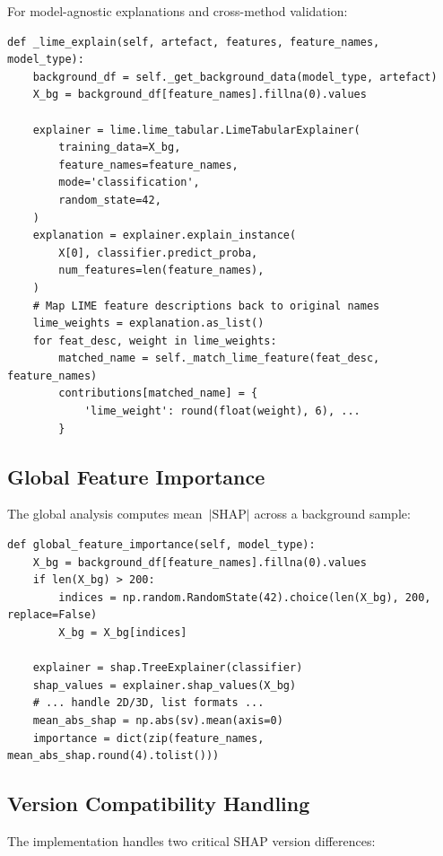 \documentclass[12pt,a4paper]{report}
\begin{document}
For model-agnostic explanations and cross-method validation:

\begin{lstlisting}[caption={LIME instance explanation (simplified)},label={lst:lime_explain}]
def _lime_explain(self, artefact, features, feature_names, model_type):
    background_df = self._get_background_data(model_type, artefact)
    X_bg = background_df[feature_names].fillna(0).values

    explainer = lime.lime_tabular.LimeTabularExplainer(
        training_data=X_bg,
        feature_names=feature_names,
        mode='classification',
        random_state=42,
    )
    explanation = explainer.explain_instance(
        X[0], classifier.predict_proba,
        num_features=len(feature_names),
    )
    # Map LIME feature descriptions back to original names
    lime_weights = explanation.as_list()
    for feat_desc, weight in lime_weights:
        matched_name = self._match_lime_feature(feat_desc, feature_names)
        contributions[matched_name] = {
            'lime_weight': round(float(weight), 6), ...
        }
\end{lstlisting}

\subsection{Global Feature Importance}

The global analysis computes mean~$|\text{SHAP}|$ across a background sample:

\begin{lstlisting}[caption={Global SHAP importance computation},label={lst:global_shap}]
def global_feature_importance(self, model_type):
    X_bg = background_df[feature_names].fillna(0).values
    if len(X_bg) > 200:
        indices = np.random.RandomState(42).choice(len(X_bg), 200, replace=False)
        X_bg = X_bg[indices]

    explainer = shap.TreeExplainer(classifier)
    shap_values = explainer.shap_values(X_bg)
    # ... handle 2D/3D, list formats ...
    mean_abs_shap = np.abs(sv).mean(axis=0)
    importance = dict(zip(feature_names, mean_abs_shap.round(4).tolist()))
\end{lstlisting}

\subsection{Version Compatibility Handling}

The implementation handles two critical SHAP version differences:
\end{document}

